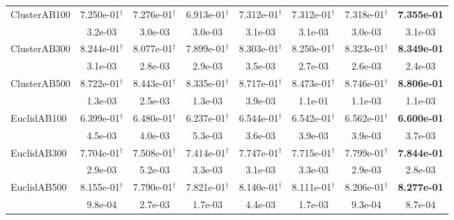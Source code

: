 {\begin{longtable}[c]{lccccccc}
    ClusterAB100         & 7.250e-01$^{\dag}$ & 7.276e-01$^{\dag}$ & 6.913e-01$^{\dag}$ & 7.312e-01$^{\dag}$ & 7.312e-01$^{\dag}$ & 7.318e-01$^{\dag}$ & \textbf{7.355e-01} \\
                                                & 3.2e-03            & 3.0e-03            & 3.0e-03            & 3.1e-03            & 3.1e-03            & 3.0e-03                      & 3.1e-03            \\
    \midrule
    ClusterAB300        & 8.244e-01$^{\dag}$ & 8.077e-01$^{\dag}$ & 7.899e-01$^{\dag}$ & 8.303e-01$^{\dag}$ & 8.250e-01$^{\dag}$ & 8.323e-01$^{\dag}$  & \textbf{8.349e-01} \\
                                            & 3.1e-03            & 2.8e-03            & 2.9e-03            & 3.5e-03            & 2.7e-03            & 2.6e-03                        & 2.4e-03            \\
    \midrule
    ClusterAB500          & 8.722e-01$^{\dag}$ & 8.443e-01$^{\dag}$ & 8.335e-01$^{\dag}$ & 8.717e-01$^{\dag}$ & 8.473e-01$^{\dag}$ & 8.746e-01$^{\dag}$ & \textbf{8.806e-01} \\
                                            & 1.3e-03            & 2.5e-03            & 1.3e-03            & 3.9e-03            & 1.1e-01            & 1.1e-03                        & 1.1e-03            \\
    \midrule

    EuclidAB100          & 6.399e-01$^{\dag}$ & 6.480e-01$^{\dag}$ & 6.237e-01$^{\dag}$ & 6.544e-01$^{\dag}$ & 6.542e-01$^{\dag}$ & 6.562e-01$^{\dag}$  & \textbf{6.600e-01} \\
                                            & 4.5e-03            & 4.0e-03            & 5.3e-03            & 3.6e-03            & 3.9e-03            & 3.9e-03                         & 3.7e-03            \\
    \midrule
    EuclidAB300           & 7.704e-01$^{\dag}$ & 7.508e-01$^{\dag}$ & 7.414e-01$^{\dag}$ & 7.747e-01$^{\dag}$ & 7.715e-01$^{\dag}$ & 7.799e-01$^{\dag}$  & \textbf{7.844e-01} \\
                                            & 2.9e-03            & 5.2e-03            & 3.3e-03            & 3.1e-03            & 3.3e-03            & 2.9e-03                         & 2.8e-03            \\
    \midrule
    EuclidAB500         & 8.155e-01$^{\dag}$ & 7.790e-01$^{\dag}$ & 7.821e-01$^{\dag}$ & 8.140e-01$^{\dag}$ & 8.111e-01$^{\dag}$ & 8.206e-01$^{\dag}$  & \textbf{8.277e-01} \\
                                        & 9.8e-04            & 2.7e-03            & 1.7e-03            & 4.4e-03            & 1.7e-03            & 9.3e-04                         & 8.7e-04            \\
    \midrule


\end{longtable}}
